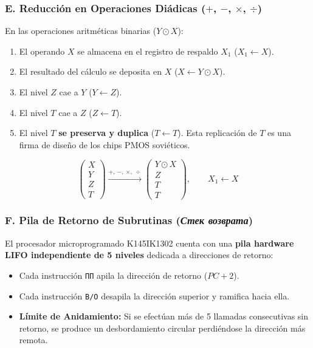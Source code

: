 \documentclass[11pt,a4paper]{article}
\begin{document}
\subsubsection{E. Reducción en Operaciones Diádicas \texorpdfstring{($+$, $-$, $\times$, $\div$)}{(+, -, *, /)}}
En las operaciones aritméticas binarias ($Y \odot X$):
\begin{enumerate}
    \item El operando $X$ se almacena en el registro de respaldo $X_1$ ($X_1 \leftarrow X$).
    \item El resultado del cálculo se deposita en $X$ ($X \leftarrow Y \odot X$).
    \item El nivel $Z$ cae a $Y$ ($Y \leftarrow Z$).
    \item El nivel $T$ cae a $Z$ ($Z \leftarrow T$).
    \item El nivel $T$ \textbf{se preserva y duplica} ($T \leftarrow T$). Esta replicación de $T$ es una firma de diseño de los chips PMOS soviéticos.
\end{enumerate}
\[
\begin{pmatrix} X \\ Y \\ Z \\ T \end{pmatrix} \xrightarrow{\mathbf{+,\ -,\ \times,\ \div}} \begin{pmatrix} Y \odot X \\ Z \\ T \\ T \end{pmatrix}, \qquad X_1 \leftarrow X
\]

\subsubsection{F. Pila de Retorno de Subrutinas (\textit{Стек возврата})}
El procesador microprogramado K145IK1302 cuenta con una \textbf{pila hardware LIFO independiente de 5 niveles} dedicada a direcciones de retorno:
\begin{itemize}
    \item Cada instrucción \texttt{ПП} apila la dirección de retorno ($PC + 2$).
    \item Cada instrucción \texttt{В/О} desapila la dirección superior y ramifica hacia ella.
    \item \textbf{Límite de Anidamiento:} Si se efectúan más de 5 llamadas consecutivas sin retorno, se produce un desbordamiento circular perdiéndose la dirección más remota.
\end{itemize}
\end{document}
